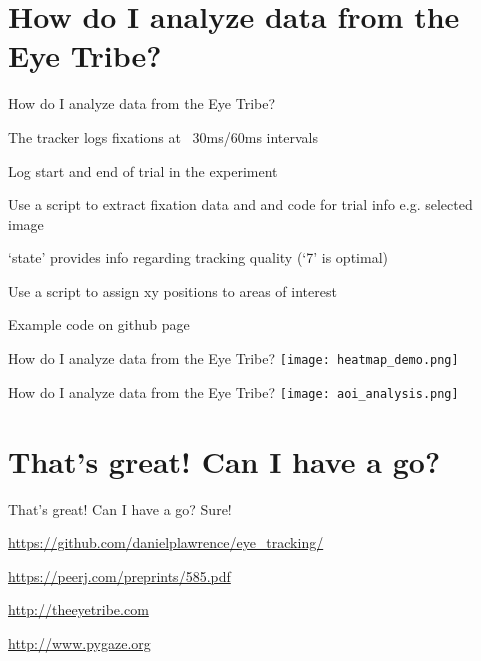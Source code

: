 \documentclass[unknownkeysallowed]{beamer}
\newenvironment{itemize*}%
  {\begin{itemize}%
    \setlength{\itemsep}{15pt}%
    \setlength{\parskip}{0pt}}%
  {\end{itemize}}
\begin{document}
\section{How do I analyze data from the Eye Tribe?}
\begin{frame}{How do I analyze data from the Eye Tribe?}
\begin{itemize*}
\item{The tracker logs fixations at ~30ms/60ms intervals}
\item{Log start and end of trial in the experiment}
\item{Use a script to extract fixation data and and code for trial info e.g. selected image}
\item{`state' provides info regarding tracking quality (`7' is optimal)}
\item{Use a script to assign xy positions to areas of interest}
\item{Example code on github page}
\end{itemize*}
\end{frame}
\begin{frame}{How do I analyze data from the Eye Tribe?}
\centering
\texttt{[image: heatmap\_demo.png]}
\end{frame}
\begin{frame}{How do I analyze data from the Eye Tribe?}
\centering
\texttt{[image: aoi\_analysis.png]}
\end{frame}
\section{That's great! Can I have a go?}
\begin{frame}{That's great! Can I have a go?}
Sure!
\begin{itemize*}
\item{\url{https://github.com/danielplawrence/eye_tracking/}}
\item{\url{https://peerj.com/preprints/585.pdf}}
\item{\url{http://theeyetribe.com}}
\item{\url{http://www.pygaze.org}}
\end{itemize*}
\end{frame}
\end{document}
